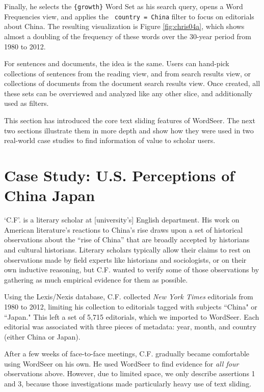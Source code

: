 \documentclass{sig-alternate}
\newcommand{\code}[1] {\texttt{#1}}
\begin{document}
Finally, he selects the  \code{\{growth\}} Word Set as his search query, opens a Word Frequencies view, and applies the \code{ country = China} filter to focus on editorials about China. The resulting visualization is Figure \ref{fig:chris04a}, which shows almost a doubling of the frequency of these words over the 30-year period from 1980 to 2012.

For sentences and documents, the idea is the same.  Users can hand-pick collections of sentences from the reading view, and from search results view, or collections of documents from the document search results view.  Once created, all these sets can be overviewed and analyzed like any other slice, and additionally used as filters.

This section has introduced the core text sliding features of WordSeer.  The next two sections illustrate them in more depth and show how they were used in two real-world case studies to find information of value to scholar users.

\section{Case Study: U.S. Perceptions of\\China Japan}

 `C.F'. is a literary scholar at [university's] English department. His work on American literature's reactions to China's rise draws upon a set of historical observations about the ``rise of China'' that are broadly accepted by historians and cultural historians. Literary scholars typically allow their claims to rest on observations made by field experts like historians and sociologists, or on their own inductive reasoning, but C.F. wanted to verify some of those observations by gathering as much empirical evidence for them as possible. 
 
Using the Lexis/Nexis database, C.F. collected \emph{New York Times} editorials from 1980 to 2012, limiting his collection to editorials tagged with subjects ``China" or ``Japan." This left a set of 5,715 editorials, which we imported to WordSeer. Each editorial was associated with three pieces of metadata: year, month, and country (either China or Japan).

After a few weeks of face-to-face meetings, C.F. gradually became comfortable using WordSeer on his own.  He used WordSeer to find evidence for \emph{all four} observations above. However, due to limited space, we only describe assertions 1 and 3, because those investigations made particularly heavy use of text sliding.
\end{document}
